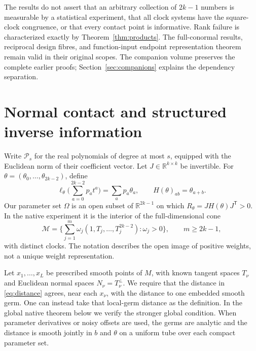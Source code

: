 \documentclass[11pt,reqno]{amsart}
\numberwithin{equation}{section}
\theoremstyle{definition}\newtheorem{definition}[theorem]{Definition}
\theoremstyle{remark}\newtheorem{remark}[theorem]{Remark}
\newcommand{\R}{\mathbb R}
\newcommand{\cP}{\mathcal P}
\newcommand{\cM}{\mathcal M}
\begin{document}
The results do not assert that an arbitrary collection of $2k-1$ numbers is measurable by a statistical experiment, that all clock systems have the square-clock congruence, or that every contact point is informative. Rank failure is characterized exactly by Theorem~\ref{thm:products}. The full-conormal results, reciprocal design fibres, and function-input endpoint representation theorem remain valid in their original scopes. The companion volume preserves the complete earlier proofs; Section~\ref{sec:companions} explains the dependency separation.

\section{Normal contact and structured inverse information}\label{sec:normal}
Write $\cP_s$ for the real polynomials of degree at most $s$, equipped with the Euclidean norm of their coefficient vector. Let $J\in\R^{k\times k}$ be invertible. For $\theta=(\theta_0,\ldots,\theta_{2k-2})$, define
\[
 \ell_\theta\Big(\sum_{a=0}^{2k-2}p_a t^a\Big)=\sum_a p_a\theta_a,
 \qquad H(\theta)_{ab}=\theta_{a+b}.
\]
Our parameter set $\Omega$ is an open subset of $\R^{2k-1}$ on which $R_\theta=JH(\theta)J^{\mathsf T}>0$. In the native experiment it is the interior of the full-dimensional cone
\begin{equation}\label{eq:momentcone}
 \cM=\Big\{\sum_{j=1}^m\omega_j(1,T_j,\ldots,T_j^{2k-2}):\omega_j>0\Big\},
 \qquad m\ge2k-1,
\end{equation}
with distinct clocks. The notation describes the open image of positive weights, not a unique weight representation.

Let $x_1,\ldots,x_L$ be prescribed smooth points of $M$, with known tangent spaces $T_\nu$ and Euclidean normal spaces $N_\nu=T_\nu^\perp$. We require that the distance in \eqref{eq:distance} agrees, near each $x_\nu$, with the distance to one embedded smooth germ. One can instead take that local-germ distance as the definition. In the global native theorem below we verify the stronger global condition. When parameter derivatives or noisy offsets are used, the germs are analytic and the distance is smooth jointly in $b$ and $\theta$ on a uniform tube over each compact parameter set.
\end{document}
